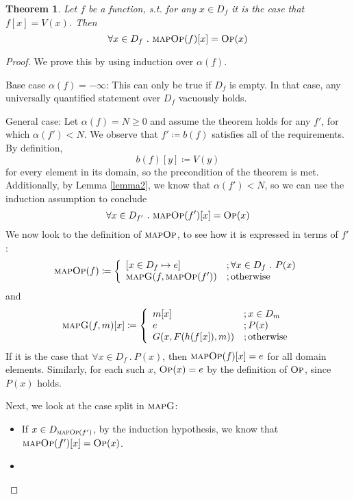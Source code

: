 \documentclass{article}
\newtheorem{theorem}{Theorem}[section]
\newcommand{\iteDef}[4]{
  #1 \coloneqq \left\{
\begin{array}{ll}
      #2 &; #3 \\
      #4 &; \text{otherwise}\\
\end{array} 
\right. 
}
\newcommand{\op}{\textsc{Op}}
\newcommand{\mop}{\textsc{mapOp}}
\newcommand{\mapg}{\textsc{mapG}}
\begin{document}

\begin{theorem}
Let $f$ be a function, s.t. for any $x \in D_f$ it is the case that $f[x] = V(x)$. Then
\[
\forall x \in D_f \ .\ \mop(f)[x] = \op(x)
\]
\end{theorem}

\begin{proof}
We prove this by using induction over $\alpha(f)$.

Base case $\alpha(f) = -\infty$: This can only be true if $D_f$ is empty. In that case, any universally quantified statement over $D_f$ vacuously holds.

General case: Let $\alpha(f) = N \ge 0$ and assume the theorem holds for any $f'$, for which $\alpha(f') < N$.
We observe that $f' \coloneqq b(f)$ satisfies all of the requirements. By definition, 
\[
b(f)[y] \coloneqq V(y)
\]
for every element in its domain, so the precondition of the theorem is met. Additionally, by Lemma \ref{lemma2}, we know that $\alpha(f') < N$, so we can use the induction assumption to conclude 
\[
\forall x \in D_{f'} \ .\ \mop(f')[x] = \op(x)
\]
We now look to the definition of $\mop$, to see how it is expressed in terms of $f'$:
\[
\iteDef{\mop(f)}{[ x \in D_f \mapsto e ]}{\forall x \in D_f \ .\ P(x)}{\mapg(f, \mop(f'))}
\]
and
\[
\mapg(f, m)[x] \coloneqq \left\{
\begin{array}{ll}
      m[x] &; x \in D_m \\
      e &; P(x) \\
      G(x, F(h(f[x]), m)) &; \text{otherwise}\\
\end{array} 
\right. 
\]
If it is the case that $\forall x \in D_f \ .\ P(x)$, then $\mop(f)[x] = e$ for all domain elements.
Similarly, for each such $x$, $\op(x) = e$ by the definition of $\op$, since $P(x)$ holds.

Next, we look at the case split in $\mapg$:
\begin{itemize}
\item If $x \in D_{\mop(f')}$, by the induction hypothesis, we know that $\mop(f')[x] = \op(x)$.
\item 



\end{itemize}
\end{proof}
\end{document}
